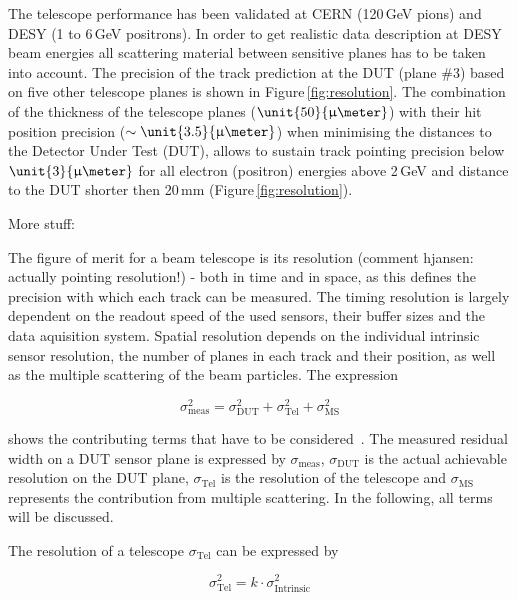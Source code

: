 
The telescope performance has been validated at CERN (120\,GeV pions) and DESY (1 to 6\,GeV positrons). 
In order to get realistic data description at DESY beam energies all scattering material between sensitive planes has to be taken into account. 
The precision of the track prediction at the DUT (plane \#3) based on five other telescope planes is shown in Figure\,\ref{fig:resolution}. 
The combination of the thickness of the telescope planes ($\unit{50}{\upmu\meter}$) with their hit position precision ($\sim\unit{3.5}{\upmu\meter}$)
 when minimising the distances to the Detector Under Test (DUT), 
 allows to sustain track pointing precision below $\unit{3}{\upmu\meter}$ for all electron (positron) energies above 2\,GeV and distance to the DUT shorter then 20\,mm (Figure\,\ref{fig:resolution}).

More stuff:


The figure of merit for a beam telescope is its resolution (comment hjansen: actually pointing resolution!) - both in time and in
space, as this defines the precision with which each track can be measured. 
The timing resolution is largely dependent on the readout speed of the used
sensors, their buffer sizes and the data aquisition system. 
Spatial resolution depends on the individual intrinsic sensor resolution, the number of planes in
each track and their position, as well as the multiple scattering of the beam particles. 
The expression

\begin{equation}
\label{eq:telescoperesolutionequation}
\sigma_{\textrm{meas}}^2 = \sigma_{\textrm{DUT}}^2 + \sigma_{\textrm{Tel}}^2 +
\sigma_{\textrm{MS}}^2
\end{equation}

shows the contributing terms that have to be
considered~\cite{ref:eudetreport200902}. 
The measured residual width on a DUT sensor plane is expressed by $\sigma_{\textrm{meas}}$,
$\sigma_{\textrm{DUT}}$ is the actual achievable resolution on the DUT plane,
$\sigma_{\textrm{Tel}}$ is the resolution of the telescope and
$\sigma_{\textrm{MS}}$ represents the contribution from multiple scattering.
In the following, all terms will be discussed.


The resolution of a telescope $\sigma_{\textrm{Tel}}$ can be expressed by

\begin{equation}
\sigma_{\textrm{Tel}}^2 = k \cdot \sigma_{\textrm{Intrinsic}}^2
\end{equation}

